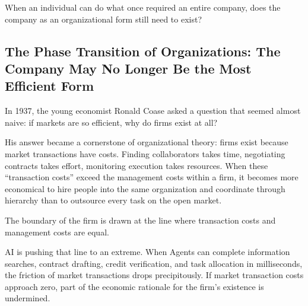 \vspace{1em}

When an individual can do what once required an entire company, does the company as an organizational form still need to exist?

\subsection{The Phase Transition of Organizations: The Company May No Longer Be the Most Efficient Form}

In 1937, the young economist Ronald Coase asked a question that seemed almost naive: if markets are so efficient, why do firms exist at all?

His answer became a cornerstone of organizational theory: firms exist because market transactions have costs. Finding collaborators takes time, negotiating contracts takes effort, monitoring execution takes resources. When these ``transaction costs'' exceed the management costs within a firm, it becomes more economical to hire people into the same organization and coordinate through hierarchy than to outsource every task on the open market.

\vspace{1em}

The boundary of the firm is drawn at the line where transaction costs and management costs are equal.

AI is pushing that line to an extreme. When Agents can complete information searches, contract drafting, credit verification, and task allocation in milliseconds, the friction of market transactions drops precipitously. If market transaction costs approach zero, part of the economic rationale for the firm's existence is undermined.

\vspace{1em}



